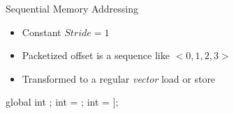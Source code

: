 \begin{frame}[fragile]{Sequential Memory Addressing}

\begin{itemize}
    \item Constant $Stride = 1$
    \item Packetized offset is a sequence like $<0, 1, 2, 3>$
    \item Transformed to a regular \emph{vector} load or store
\end{itemize}

\begin{codebox}[commandchars=\\\[\]]
global int \uniform[*src];
int \varying[tid] = ;
int \uniform[x] = \uniform[src]\idx[\varying[tid]];
\end{codebox}


\end{frame}


